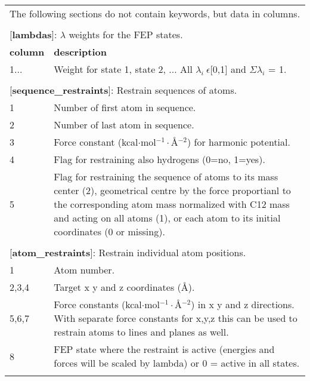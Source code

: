 \documentclass[a4paper,11pt]{article}
\begin{document}
\begin{longtable}{|p{78pt}|p{158pt}|p{158pt}|}
\multicolumn{3}{p{394pt}}{The following sections do not contain keywords, but data in columns.}\\
\multicolumn{3}{p{394pt}}{}\\

\multicolumn{3}{p{394pt}}{[\textbf{lambdas}]: $\lambda$ weights for the FEP states.}\\
\hline \textbf{column} & \multicolumn{2}{p{320pt}|}{\textbf{description}}\\
\hline1... & \multicolumn{2}{p{320pt}|}{Weight for state 1, state 2, ... All $\lambda_i ~ \epsilon$[0,1] and $\Sigma\lambda_i$ = 1.}\\
\hline
\multicolumn{3}{p{394pt}}{}\\

\multicolumn{3}{p{394pt}}{[\textbf{sequence\_restraints}]: Restrain sequences of atoms.}\\
\hline 1 & \multicolumn{2}{p{320pt}|}{Number of first atom in sequence.}\\
\hline 2 & \multicolumn{2}{p{320pt}|}{Number of last atom in sequence.}\\
\hline 3 & \multicolumn{2}{p{320pt}|}{Force constant (kcal$\cdot$mol$^{-1}\cdot${\AA}$^{-2}$) for harmonic potential.}\\
\hline 4 & \multicolumn{2}{p{320pt}|}{Flag for restraining also hydrogens (0=no, 1=yes).}\\
\hline 5 & \multicolumn{2}{p{320pt}|}{Flag for restraining the sequence of atoms to its mass center (2), geometrical centre by the force proportianl to the corresponding atom mass normalized with C12 mass and acting on all atoms (1), or each atom to its initial coordinates (0 or missing).}\\
\hline
\multicolumn{3}{p{394pt}}{}\\

\multicolumn{3}{p{394pt}}{[\textbf{atom\_restraints}]: Restrain individual atom positions.}\\
\hline 1 & \multicolumn{2}{p{320pt}|}{Atom number.}\\
\hline 2,3,4 & \multicolumn{2}{p{320pt}|}{Target x y and z coordinates ({\AA}).}\\
\hline 5,6,7 & \multicolumn{2}{p{320pt}|}{Force constants (kcal$\cdot$mol$^{-1}\cdot${\AA}$^{-2}$) in x y and z directions. With separate force constants for x,y,z this can be used to restrain atoms to lines and planes as well.}\\
\hline 8 & \multicolumn{2}{p{320pt}|}{FEP state where the restraint is active (energies and forces will be scaled by lambda) or 0 = active in all states.}\\
\hline
\multicolumn{3}{p{394pt}}{}\\


\end{longtable}
\end{document}
